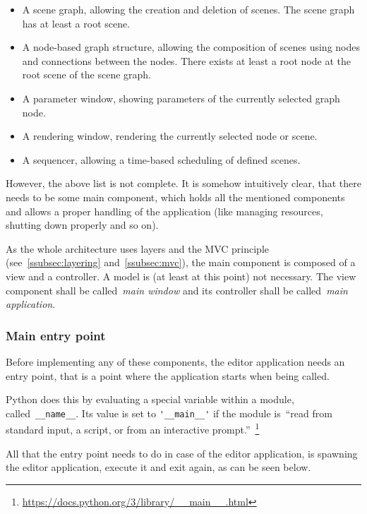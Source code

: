 \documentclass[
    a4paper,      %
    10pt,         %
    openright,    %
    notitlepage,  %
    parskip=half, %
]{scrreprt}       %
\theoremstyle{definition}                    %
\begin{document}
\begin{itemize}
\item A scene graph, allowing the creation and deletion of scenes. The scene graph
      has at least a root scene.
\item A node-based graph structure, allowing the composition of scenes using nodes
      and connections between the nodes. There exists at least a root node at
      the root scene of the scene graph.
\item A parameter window, showing parameters of the currently selected graph node.
\item A rendering window, rendering the currently selected node or scene.
\item A sequencer, allowing a time-based scheduling of defined scenes.
\end{itemize}

However, the above list is not complete. It is somehow intuitively clear, that
there needs to be some main component, which holds all the mentioned components
and allows a proper handling of the application (like managing resources,
shutting down properly and so on).

As the whole architecture uses layers and the MVC principle
(see~\autoref{ssubsec:layering} and~\autoref{ssubsec:mvc}), the main component is
composed of a view and a controller. A model is (at least at this point) not
necessary. The view component shall be called~\textit{main window} and its
controller shall be called~\textit{main application}.


\subsubsection{Main entry point}
\label{ssubsec:main-entry-point}

Before implementing any of these components, the editor application needs an
entry point, that is a point where the application starts when being called.

Python does this by evaluating a special variable within a module,
called~\verb+__name__+. Its value is set to \verb+'__main__'+ if the module
is~\enquote{read from standard input, a script, or from an interactive
prompt.}~\footnote{\url{https://docs.python.org/3/library/__main__.html}}

All that the entry point needs to do in case of the editor application, is
spawning the editor application, execute it and exit again, as can be seen below.
\end{document}
